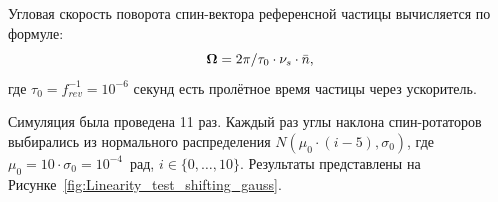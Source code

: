 Угловая скорость поворота спин-вектора референсной частицы вычисляется по формуле:~\cite[стр.~4]{COSY:SpinTuneMapping}
\[
\boldsymbol{\Omega} = 2\pi/\tau_0\cdot \nu_s \cdot \bar n,
\]
где $\tau_0 = f^{-1}_{rev} = 10^{-6}$ секунд есть пролётное время частицы через ускоритель.

Симуляция была проведена 11 раз. Каждый раз углы наклона
спин-ротаторов выбирались из нормального распределения
$N(\mu_0\cdot(i-5), \sigma_0)$, где ${\mu_0 = 10\cdot \sigma_0 =10^{-4}}$~рад, 
${i\in\lbrace0,\dots, 10\rbrace}$. Результаты представлены
на Рисунке~\ref{fig:Linearity_test_shifting_gauss}.

\begin{figure}[H]
	\centering
\end{figure}
